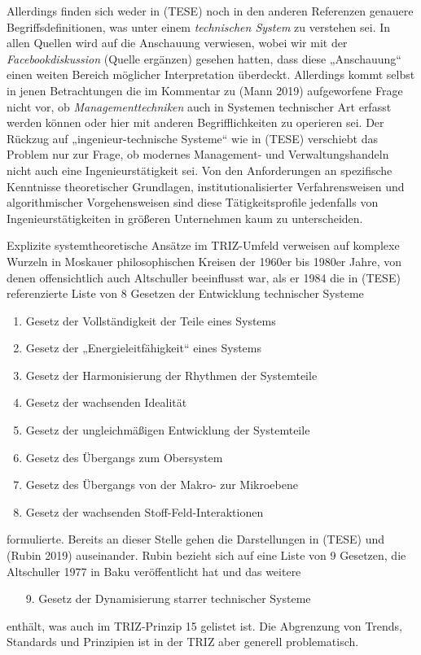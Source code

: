 \documentclass[11pt,a4paper]{article}
\begin{document}
Allerdings finden sich weder in (TESE) noch in den anderen Referenzen genauere
Begriffsdefinitionen, was unter einem \emph{technischen System} zu verstehen
sei. In allen Quellen wird auf die Anschauung verwiesen, wobei wir mit der
\emph{Facebookdiskussion} (Quelle ergänzen) gesehen hatten, dass diese
„Anschauung“ einen weiten Bereich möglicher Interpretation
überdeckt. Allerdings kommt selbst in jenen Betrachtungen die im Kommentar zu
(Mann 2019) aufgeworfene Frage nicht vor, ob \emph{Managementtechniken} auch
in Systemen technischer Art erfasst werden können oder hier mit anderen
Begriff\-lichkeiten zu operieren sei.  Der Rückzug auf „ingenieur-technische
Systeme“ wie in (TESE) verschiebt das Problem nur zur Frage, ob modernes
Management- und Verwaltungshandeln nicht auch eine Ingenieurstätigkeit sei.
Von den Anforderungen an spezifische Kenntnisse theoretischer Grundlagen,
institutionalisierter Verfahrensweisen und algorithmischer Vorgehensweisen
sind diese Tätigkeitsprofile jedenfalls von Ingenieurstätigkeiten in größeren
Unternehmen kaum zu unterscheiden.

Explizite systemtheoretische Ansätze im TRIZ-Umfeld verweisen auf komplexe
Wurzeln in Moskauer philosophischen Kreisen der 1960er bis 1980er Jahre, von
denen offensichtlich auch Altschuller beeinflusst war, als er 1984 die in
(TESE) referenzierte Liste von 8 Gesetzen der Entwicklung technischer Systeme

\begin{enumerate}[noitemsep]
\item Gesetz der Vollständigkeit der Teile eines Systems
\item Gesetz der „Energieleitfähigkeit“ eines Systems
\item Gesetz der Harmonisierung der Rhythmen der Systemteile
\item Gesetz der wachsenden Idealität
\item Gesetz der ungleichmäßigen Entwicklung der Systemteile
\item Gesetz des Übergangs zum Obersystem
\item Gesetz des Übergangs von der Makro- zur Mikroebene
\item Gesetz der wachsenden Stoff-Feld-Interaktionen
\end{enumerate}
formulierte. Bereits an dieser Stelle gehen die Darstellungen in (TESE) und
(Rubin 2019) auseinander. Rubin bezieht sich auf eine Liste von 9 Gesetzen,
die Altschuller 1977 in Baku veröffentlicht hat und das weitere

\begin{enumerate}[noitemsep]
\item[9.] Gesetz der Dynamisierung starrer technischer Systeme
\end{enumerate}
enthält, was auch im TRIZ-Prinzip 15 gelistet ist. Die Abgrenzung von Trends,
Standards und Prinzipien ist in der TRIZ aber generell problematisch.
\end{document}
